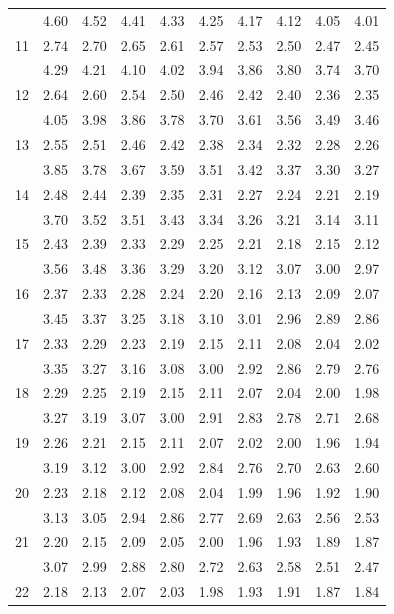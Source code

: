 \documentclass[lang=cn,10pt]{elegantbook}
\begin{document}
\begin{longtable}{c|ccccccccc}
      & 4.60 & 4.52 & 4.41 & 4.33 & 4.25 & 4.17 & 4.12 & 4.05 & 4.01 \\
    11& 2.74 & 2.70 & 2.65 & 2.61 & 2.57 & 2.53 & 2.50 & 2.47 & 2.45 \\
      & 4.29 & 4.21 & 4.10 & 4.02 & 3.94 & 3.86 & 3.80 & 3.74 & 3.70 \\
    12& 2.64 & 2.60 & 2.54 & 2.50 & 2.46 & 2.42 & 2.40 & 2.36 & 2.35 \\
      & 4.05 & 3.98 & 3.86 & 3.78 & 3.70 & 3.61 & 3.56 & 3.49 & 3.46 \\
    13& 2.55 & 2.51 & 2.46 & 2.42 & 2.38 & 2.34 & 2.32 & 2.28 & 2.26 \\
      & 3.85 & 3.78 & 3.67 & 3.59 & 3.51 & 3.42 & 3.37 & 3.30 & 3.27 \\
    14& 2.48 & 2.44 & 2.39 & 2.35 & 2.31 & 2.27 & 2.24 & 2.21 & 2.19 \\
      & 3.70 & 3.52 & 3.51 & 3.43 & 3.34 & 3.26 & 3.21 & 3.14 & 3.11 \\
    15& 2.43 & 2.39 & 2.33 & 2.29 & 2.25 & 2.21 & 2.18 & 2.15 & 2.12 \\
      & 3.56 & 3.48 & 3.36 & 3.29 & 3.20 & 3.12 & 3.07 & 3.00 & 2.97 \\
    16& 2.37 & 2.33 & 2.28 & 2.24 & 2.20 & 2.16 & 2.13 & 2.09 & 2.07 \\
      & 3.45 & 3.37 & 3.25 & 3.18 & 3.10 & 3.01 & 2.96 & 2.89 & 2.86 \\
    17& 2.33 & 2.29 & 2.23 & 2.19 & 2.15 & 2.11 & 2.08 & 2.04 & 2.02 \\
      & 3.35 & 3.27 & 3.16 & 3.08 & 3.00 & 2.92 & 2.86 & 2.79 & 2.76 \\
    18& 2.29 & 2.25 & 2.19 & 2.15 & 2.11 & 2.07 & 2.04 & 2.00 & 1.98 \\
      & 3.27 & 3.19 & 3.07 & 3.00 & 2.91 & 2.83 & 2.78 & 2.71 & 2.68 \\
    19& 2.26 & 2.21 & 2.15 & 2.11 & 2.07 & 2.02 & 2.00 & 1.96 & 1.94 \\
      & 3.19 & 3.12 & 3.00 & 2.92 & 2.84 & 2.76 & 2.70 & 2.63 & 2.60 \\
    20& 2.23 & 2.18 & 2.12 & 2.08 & 2.04 & 1.99 & 1.96 & 1.92 & 1.90 \\
      & 3.13 & 3.05 & 2.94 & 2.86 & 2.77 & 2.69 & 2.63 & 2.56 & 2.53 \\
    21& 2.20 & 2.15 & 2.09 & 2.05 & 2.00 & 1.96 & 1.93 & 1.89 & 1.87 \\
      & 3.07 & 2.99 & 2.88 & 2.80 & 2.72 & 2.63 & 2.58 & 2.51 & 2.47 \\
    22& 2.18 & 2.13 & 2.07 & 2.03 & 1.98 & 1.93 & 1.91 & 1.87 & 1.84 \\

\end{longtable}
\end{document}
